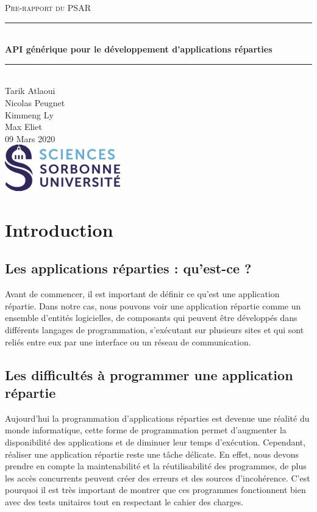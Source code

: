 \documentclass{article}
\date{\today}
\author{Tarik Atlaoui \\ Nicolas Peugnet \\ Kimmeng Ly \\ Max Eliet}
\begin{document}
\begin{titlepage}
	\enlargethispage{2cm}
	\newcommand{\HRule}{\rule{\linewidth}{0.5mm}}
	\center
	\textsc{\LARGE
	Pre-rapport du PSAR 
	} \\[1cm]
	\HRule \\[0.4cm]
	{ \huge \bfseries API générique pour le développement d'applications réparties \\[0.15cm] }
	\HRule \\[4cm]
	\large{Tarik Atlaoui \\[3mm] Nicolas Peugnet \\[3mm] Kimmeng Ly \\[3mm] Max Eliet} \\[3cm]
	09 Mars 2020 \\[3cm]
	\hfill \includegraphics[width=5cm]{logoSU.jpg}
\end{titlepage}

	\newpage
		\section{Introduction}
			\subsection{Les applications réparties : qu'est-ce ?}
			\large{ Avant de commencer, il est important de définir ce qu’est une application répartie. Dans notre cas, nous pouvons voir une application répartie comme un ensemble d’entités logicielles, de composants qui peuvent être développés dans différents langages de programmation, s’exécutant sur plusieurs sites et qui sont reliés entre eux par une interface ou un réseau de communication.}
			\subsection{Les difficultés à programmer une application répartie}
			\large { Aujourd’hui la programmation d’applications réparties est devenue une réalité du monde informatique, cette forme de programmation permet d'augmenter la disponibilité des applications et de diminuer leur temps d'exécution. Cependant, réaliser une application répartie reste une tâche délicate. En effet, nous devons prendre en compte la maintenabilité et la réutilisabilité des programmes, de plus les accès concurrents peuvent créer des erreurs et des sources d'incohérence. C’est pourquoi il est très important de montrer que ces programmes fonctionnent bien avec des tests unitaires tout en respectant le cahier des charges.}
\end{document}
